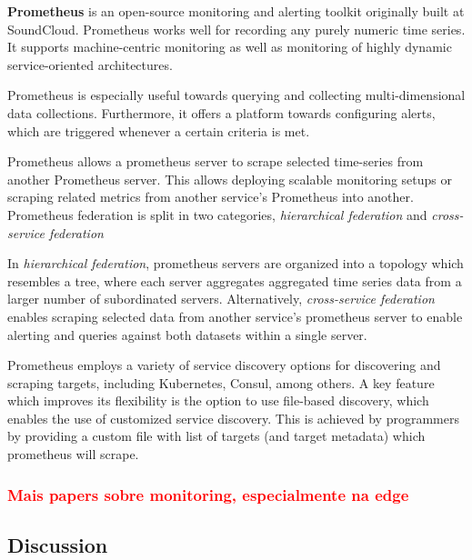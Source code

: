 \textbf{Prometheus} \cite{prometheus} is an open-source monitoring and alerting toolkit originally built at SoundCloud. Prometheus works well for recording any purely numeric time series. It supports machine-centric monitoring as well as monitoring of highly dynamic service-oriented architectures. 

Prometheus is especially useful towards querying and collecting multi-dimensional data collections. Furthermore, it offers a platform towards configuring alerts, which are triggered whenever a certain criteria is met.

Prometheus allows a prometheus server to scrape selected time-series from another Prometheus server. This allows deploying scalable monitoring setups or scraping related metrics from another service's Prometheus into another. Prometheus federation is split in two categories, \textit{hierarchical federation} and \textit{cross-service federation} 

In \textit{hierarchical federation}, prometheus servers are organized into a topology which resembles a tree, where each server aggregates aggregated time series data from a larger number of subordinated servers. Alternatively,  \textit{cross-service federation} enables scraping selected data from another service's prometheus server to enable alerting and queries against both datasets within a single server. 

Prometheus employs a variety of service discovery options for discovering and scraping targets, including Kubernetes, Consul, among others. A key feature which improves its flexibility is the option to use file-based discovery,  which enables the use of customized service discovery. This is achieved by programmers by providing a custom file with list of targets (and target metadata) which prometheus will scrape.

\subsubsection{\textcolor{red}{Mais papers sobre monitoring, especialmente na edge}}


\subsection{Discussion}